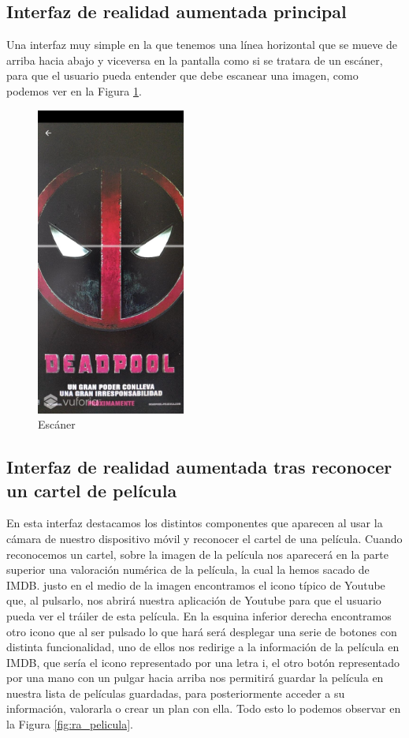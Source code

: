 \subsection{Interfaz de realidad aumentada principal}
\label{makereference3.4.4}
Una interfaz muy simple en la que tenemos una línea horizontal que se mueve de arriba hacia abajo y viceversa en la pantalla como si se tratara de un escáner, para que el usuario
pueda entender que debe escanear una imagen, como podemos ver en la Figura \ref{fig:escaner}.
\begin{figure}[H]
    \centering
    \includegraphics[height=4in]{figures/chapter-3/escaner.jpg}
    \caption{Escáner}
    \label{fig:escaner}
\end{figure}
\subsection{Interfaz de realidad aumentada tras reconocer un cartel de película}
\label{makereference3.4.5}
En esta interfaz destacamos los distintos componentes que aparecen al usar la cámara de nuestro dispositivo móvil y reconocer el cartel de una película.
Cuando reconocemos un cartel, sobre la imagen de la película nos aparecerá en la parte superior una valoración numérica de la película, la cual la hemos 
sacado de IMDB. justo en el medio de la imagen encontramos el icono típico de Youtube que, al pulsarlo, nos abrirá nuestra aplicación de Youtube para que
el usuario pueda ver el tráiler de esta película. En la esquina inferior derecha encontramos otro icono que al ser pulsado lo que hará será desplegar una serie de botones con distinta funcionalidad,
uno de ellos nos redirige a la información de la película en IMDB, que sería el icono representado por una letra i, el otro botón representado por una mano con un pulgar hacia arriba nos permitirá
guardar la película en nuestra lista de películas guardadas, para posteriormente acceder a su información, valorarla o crear un plan con ella. Todo esto lo podemos observar en la Figura \ref{fig:ra_pelicula}.

